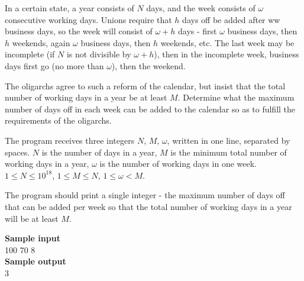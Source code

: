 \documentclass[a4paper]{article}
\begin{document}
In a certain state, a year consists of $N$ days, and the week consists of $\omega$ consecutive working days. Unions require that $h$ days off be added after ww business days, so the week will consist of $\omega + h$ days - first $\omega$ business days, then $h$ weekends, again $\omega$ business days, then $h$ weekends, etc. The last week may be incomplete (if $N$ is not divisible by $\omega + h$), then in the incomplete week, business days first go (no more than $\omega$), then the weekend.

The oligarchs agree to such a reform of the calendar, but insist that the total number of working days in a year be at least $M$. Determine what the maximum number of days off in each week can be added to the calendar so as to fulfill the requirements of the oligarchs.

The program receives three integers $N$, $M$, $\omega$, written in one line, separated by spaces. $N$ is the number of days in a year, $M$ is the minimum total number of working days in a year, $\omega$ is the number of working days in one week. $1 \le N \le 10^{18}$, $1 \le M \le N$, $1 \le \omega < M$.

The program should print a single integer - the maximum number of days off that can be added per week so that the total number of working days in a year will be at least $M$.

\LINE

\noindent \textbf{Sample input}\\
100 70 8\\

\noindent \textbf{Sample output}\\
3
\end{document}
